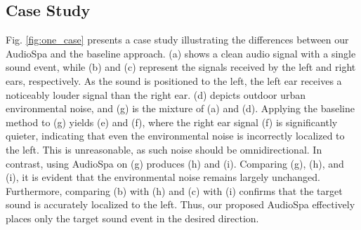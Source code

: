 \documentclass{IEEEtran}
\begin{document}
\subsection{Case Study}
\begin{figure*}[t]
  \centering
  \caption{A case study of spatializing specific sound events. Each spectrogram's x-axis represents time, the y-axis represents frequency. Baseline is DSP, SNR is 10dB, and the audio duration is 4 seconds. In the binaural audio, the target sound is positioned directly to the left.}
  \label{fig:one_case}
\end{figure*}

Fig. \ref{fig:one_case} presents a case study illustrating the differences between our AudioSpa and the baseline approach. (a) shows a clean audio signal with a single sound event, while (b) and (c) represent the signals received by the left and right ears, respectively. As the sound is positioned to the left, the left ear receives a noticeably louder signal than the right ear. (d) depicts outdoor urban environmental noise, and (g) is the mixture of (a) and (d). Applying the baseline method to (g) yields (e) and (f), where the right ear signal (f) is significantly quieter, indicating that even the environmental noise is incorrectly localized to the left. This is unreasonable, as such noise should be omnidirectional. In contrast, using AudioSpa on (g) produces (h) and (i). Comparing (g), (h), and (i), it is evident that the environmental noise remains largely unchanged. Furthermore, comparing (b) with (h) and (c) with (i) confirms that the target sound is accurately localized to the left. Thus, our proposed AudioSpa effectively places only the target sound event in the desired direction.
\end{document}
